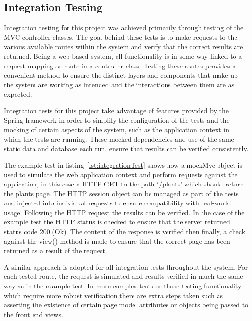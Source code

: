 \subsection{Integration Testing}

Integration testing for this project was achieved primarily through testing of the MVC controller classes. The goal behind these tests is to make requests to the various available routes within the system and verify that the correct results are returned. Being a web based system, all functionality is in some way linked to a request mapping or route in a controller class. Testing these routes provides a convenient method to ensure the distinct layers and components that make up the system are working as intended and the interactions between them are as expected. 

Integration tests for this project take advantage of features provided by the Spring framework in order to simplify the configuration of the tests and the mocking of certain aspects of the system, such as the application context in which the tests are running. These mocked dependencies and use of the same static data and database each run, ensure that results can be verified consistently.

 The example test in listing~\ref{lst:integrationTest} shows how a mockMvc object is used to simulate the web application context and perform requests against the application, in this case a HTTP GET to the path `/plants' which should return the plants page. The HTTP session object can be managed as part of the tests and injected into individual requests to ensure compatibility with real-world usage. Following the HTTP request the results can be verified. In the case of the example test the HTTP status is checked to ensure that the server returned status code 200 (Ok). The content of the response is verified then finally, a check against the view() method is made to ensure that the correct page has been returned as a result of the request. 



A similar approach is adopted for all integration tests throughout the system. For each tested route, the request is simulated and results verified in much the same way as in the example test. In more complex tests or those testing functionality which require more robust verification there are extra steps taken such as asserting the existence of certain page model attributes or objects being passed to the front end views.


